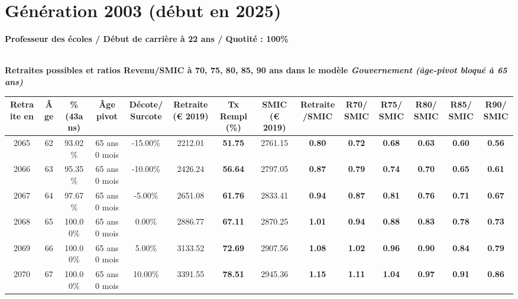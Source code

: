 \section{Génération 2003 (début en 2025)\label{ProfEcoles_100_2003_22_0}} 
 
{\bf \noindent Professeur des écoles / Début de carrière à 22 ans / Quotité : 100\%}  ~ 

 ~\\{\bf \noindent Retraites possibles et ratios Revenu/SMIC à 70, 75, 80, 85, 90 ans dans le modèle \emph{Gouvernement (âge-pivot bloqué à 65 ans)}}  
 
\begin{adjustbox}{max width=\textwidth} 
\begin{tabular}[htb]{|c|c||c|c|c||c|c||c|c||c|c|c|c|c|} 
\hline 
 Retraite en &  Âge &  \%(43ans) &  Âge pivot &  Décote/Surcote &  Retraite (\euro{} 2019) &  Tx Rempl(\%) &  SMIC (\euro{} 2019) &  Retraite/SMIC &  R70/SMIC &  R75/SMIC &  R80/SMIC &  R85/SMIC &  R90/SMIC \\ 
\hline \hline 
 2065 &  62 &  93.02\% &  65 ans 0 mois &  -15.00\% &  2212.01 &  {\bf 51.75} &  2761.15 &  {\bf {\color{red} 0.80}} &  {\bf {\color{red} 0.72}} &  {\bf {\color{red} 0.68}} &  {\bf {\color{red} 0.63}} &  {\bf {\color{red} 0.60}} &  {\bf {\color{red} 0.56}} \\ 
\hline 
 2066 &  63 &  95.35\% &  65 ans 0 mois &  -10.00\% &  2426.24 &  {\bf 56.64} &  2797.05 &  {\bf {\color{red} 0.87}} &  {\bf {\color{red} 0.79}} &  {\bf {\color{red} 0.74}} &  {\bf {\color{red} 0.70}} &  {\bf {\color{red} 0.65}} &  {\bf {\color{red} 0.61}} \\ 
\hline 
 2067 &  64 &  97.67\% &  65 ans 0 mois &  -5.00\% &  2651.08 &  {\bf 61.76} &  2833.41 &  {\bf {\color{red} 0.94}} &  {\bf {\color{red} 0.87}} &  {\bf {\color{red} 0.81}} &  {\bf {\color{red} 0.76}} &  {\bf {\color{red} 0.71}} &  {\bf {\color{red} 0.67}} \\ 
\hline 
 2068 &  65 &  100.00\% &  65 ans 0 mois &  0.00\% &  2886.77 &  {\bf 67.11} &  2870.25 &  {\bf 1.01} &  {\bf {\color{red} 0.94}} &  {\bf {\color{red} 0.88}} &  {\bf {\color{red} 0.83}} &  {\bf {\color{red} 0.78}} &  {\bf {\color{red} 0.73}} \\ 
\hline 
 2069 &  66 &  100.00\% &  65 ans 0 mois &  5.00\% &  3133.52 &  {\bf 72.69} &  2907.56 &  {\bf 1.08} &  {\bf 1.02} &  {\bf {\color{red} 0.96}} &  {\bf {\color{red} 0.90}} &  {\bf {\color{red} 0.84}} &  {\bf {\color{red} 0.79}} \\ 
\hline 
 2070 &  67 &  100.00\% &  65 ans 0 mois &  10.00\% &  3391.55 &  {\bf 78.51} &  2945.36 &  {\bf 1.15} &  {\bf 1.11} &  {\bf 1.04} &  {\bf {\color{red} 0.97}} &  {\bf {\color{red} 0.91}} &  {\bf {\color{red} 0.86}} \\ 
\hline 
\hline 
\end{tabular} 
\end{adjustbox} 
 
